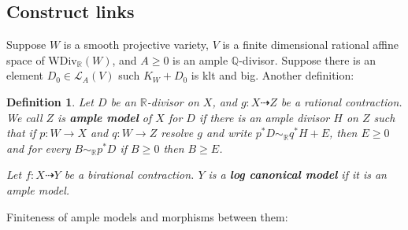 \documentclass{article}
\newtheorem{defn}{Definition}[section]
\begin{document}
\subsection{Construct links}
Suppose $ W $ is a smooth projective variety, $ V $ is a finite dimensional rational affine space of $ \mathrm{WDiv}_\mathbb{R}(W) $, and $ A\geqslant 0 $ is an ample $ \mathbb{Q} $-divisor. Suppose there is an element $ D_0\in \mathcal{L}_A(V) $ such $ K_W+D_0 $ is klt and big.
Another definition:
\begin{defn}
	Let $ D $ be an $ \mathbb{R} $-divisor on $ X $, and $ g:X\dashrightarrow Z $ be a rational contraction. We call $ Z $ is \textbf{ample model} of $ X $ for $ D $ if there is an ample divisor $ H $ on $ Z $ such that if $ p:W\to X $ and $ q:W\to Z $ resolve $ g $ and write $ p^*D\sim_\mathbb{R}q^*H+E $, then $ E\geqslant 0 $ and for every $ B\sim_\mathbb{R}p^*D $ if $ B\geqslant 0 $ then $ B\geqslant E $.
	
	Let $ f:X\dashrightarrow Y $ be a birational contraction. $ Y $ is a \textbf{log canonical model} if it is an ample model.
\end{defn}
Finiteness of ample models and morphisms between them:
\end{document}
